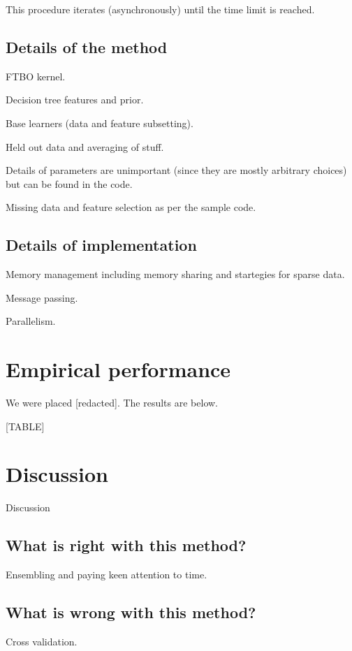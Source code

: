 \documentclass{article} %
\begin{document}
This procedure iterates (asynchronously) until the time limit is reached.

\subsection{Details of the method}

FTBO kernel.

Decision tree features and prior.

Base learners (data and feature subsetting).

Held out data and averaging of stuff.

Details of parameters are unimportant (since they are mostly arbitrary choices) but can be found in the code.

Missing data and feature selection as per the sample code.

\subsection{Details of implementation}

Memory management including memory sharing and startegies for sparse data.

Message passing.

Parallelism.

\section{Empirical performance}

We were placed [redacted].
The results are below.

[TABLE]

\section{Discussion}

Discussion

\subsection{What is right with this method?}

Ensembling and paying keen attention to time.

\subsection{What is wrong with this method?}

Cross validation.
\end{document}
